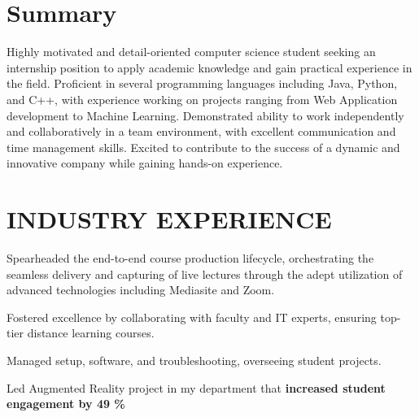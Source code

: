 \documentclass[a4paper]{deedy-resume} %
\begin{document}
\hfill
%
%
\begin{minipage}[t]{0.66\textwidth} %

\section{Summary}
Highly motivated and detail-oriented computer science student seeking an internship position to apply academic knowledge and gain practical experience in the field. Proficient in several programming languages including Java, Python, and C++, with experience working on projects ranging from Web Application development to Machine Learning. Demonstrated ability to work independently and collaboratively in a team environment, with excellent communication and time management skills. Excited to contribute to the success of a dynamic and innovative company while gaining hands-on experience.
\sectionspace

\section{INDUSTRY EXPERIENCE}


\vspace{\topsep} 

\begin{tightitemize}
\item Spearheaded the end-to-end course production lifecycle, orchestrating the seamless delivery and capturing of live lectures through the adept utilization of advanced technologies including Mediasite and Zoom.
\item Fostered excellence by collaborating with faculty and IT experts, ensuring top-tier distance learning courses.
\item Managed setup, software, and troubleshooting, overseeing student projects.
\item Led Augmented Reality project in my department that \textbf{increased student engagement by 49 \%}
\end{tightitemize}


\end{minipage}
\end{document}
